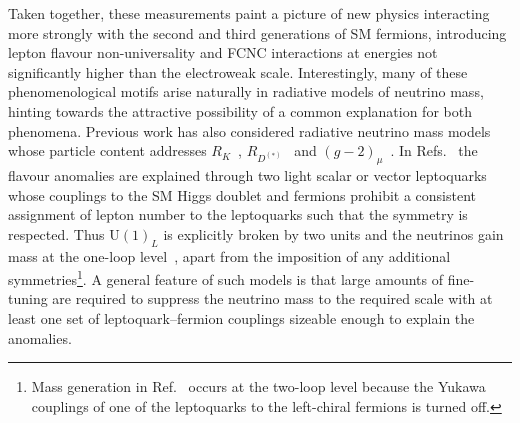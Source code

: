 Taken together, these measurements paint a picture of new physics interacting
more strongly with the second and third generations of SM fermions, introducing
lepton flavour non-universality and FCNC interactions at energies not
significantly higher than the electroweak scale. Interestingly, many of these
phenomenological motifs arise naturally in radiative models of neutrino mass,
hinting towards the attractive possibility of a common explanation for both
phenomena. Previous work has also considered radiative neutrino mass models
whose particle content addresses $R_{K}$~\cite{Pas:2015hca, Cheung:2016fjo,
  Cheung:2017efc, Cheung:2016frv, Popov:2016fzr},
$R_{D^{(*)}}$~\cite{Deppisch:2016qqd, Popov:2016fzr} and
$(g-2)_\mu$~\cite{Babu:2010vp, Cheung:2016fjo, Cheung:2017efc, Cheung:2016frv,
  Popov:2016fzr}. In Refs.~\cite{Pas:2015hca, Deppisch:2016qqd} the flavour
anomalies are explained through two light scalar or vector leptoquarks whose
couplings to the SM Higgs doublet and fermions prohibit a consistent assignment
of lepton number to the leptoquarks such that the symmetry is respected. Thus
$\mathrm{U}(1)_L$ is explicitly broken by two units and the neutrinos gain mass
at the one-loop level~\cite{AristizabalSierra:2007nf}, apart from the imposition
of any additional symmetries\footnote{Mass generation in Ref.~\cite{Babu:2010vp}
  occurs at the two-loop level because the Yukawa couplings of one of the
  leptoquarks to the left-chiral fermions is turned off.}. A general feature of
such models is that large amounts of fine-tuning are required to suppress the
neutrino mass to the required scale with at least one set of leptoquark--fermion
couplings sizeable enough to explain the anomalies.


